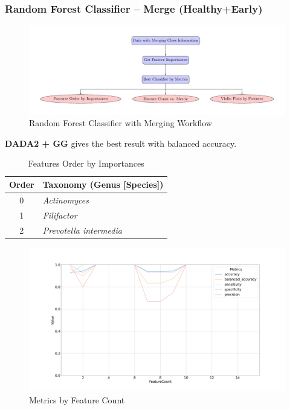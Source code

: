 \documentclass{beamer}
\begin{document}
    \begin{frame}[allowframebreaks]
        \frametitle{Random Forest Classifier -- Merge (Healthy+Early)}

        \begin{figure}
            \includegraphics[width=0.8 \linewidth]{figures/RandomForest/merge.pdf}
            \caption{Random Forest Classifier with Merging Workflow}
        \end{figure}

        \textbf{DADA2 + GG} gives the best result with balanced accuracy.

        \begin{table}
            \caption{Features Order by Importances}
            \begin{tabular}{c|l}
                Order & Taxonomy (Genus [Species]) \\ \hline
                0 & \textit{Actinomyces} \\
                1 & \textit{Filifactor} \\
                2 & \textit{Prevotella intermedia} \\
            \end{tabular}
        \end{table}

        \begin{figure}
            \includegraphics[width=0.8 \linewidth]{figures/RandomForest/one.DADA2.gg/metrics.png}
            \caption{Metrics by Feature Count}
        \end{figure}


\end{frame}
\end{document}
